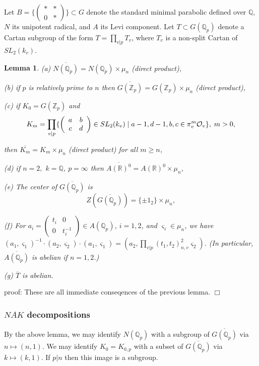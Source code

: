\documentclass[12pt]{article}
\newtheorem{lemma}[theorem]{Lemma}
\def\qqq{\mathbb{Q}}
\begin{document}
Let $B=\{\left( 
\begin{array}{cc}
\ast & * \\ 
0 & *
\end{array}
\right) \}\subset G$ denote the standard minimal parabolic
defined over $\qqq$, $N$ its unipotent radical, and
$A$ its Levi component. Let
$T\subset G(\qqq_p)$ denote a Cartan subgroup of the form
$T=\prod_{v|p}T_v$, where $T_v$ is a non-split
Cartan of $SL_2(k_v)$.

\begin{lemma}
(a) $\overline{N(\qqq_p)}=N(\qqq_p)\times \mu _n$ (direct product),

(b) if $p$ is relatively prime to $n$
then $\overline{G({\mathbb{Z}}_p)}=G({\mathbb{Z}}_p)\times \mu _n$ (direct product),

(c) if $K_0=G({\mathbb{Z}}_p)$ and 
\[
K_m=\prod_{v|p}\{\left( 
\begin{array}{cc}
a & b \\ 
c & d
\end{array}
\right) \in SL_2(k_v)\;|\;a-1,d-1,b,c\in \pi _v^m{\cal{O}}_v\},\;m>0,
\]

then $\overline{K_m}=K_m\times \mu _n$ (direct product) for all $m\geq n$,

(d) if $n=2,$ $k=\qqq$, $p=\infty $ then 
$\overline{A({\mathbb R})^0}=A({\mathbb R})^0 \times \mu _n$,

(e) The center of $\overline{G(\qqq_p)}$ is 
\[
Z(\overline{G(\qqq_p)})=
\{\pm 1_2\}\times \mu _n,
\]

(f) For $a_i=\left( 
\begin{array}{cc}
t_i & 0 \\ 
0 & t_i^{-1}
\end{array}
\right) \in A(\qqq_p)$, $i=1,2$, and $\varsigma _i\in \mu _n$, we have $%
(a_1,\varsigma _1)^{-1}\cdot (a_2,\varsigma _2)\cdot (a_1,\varsigma
_1)=(a_2,\prod_{v|p}(t_1,t_2)_{n,v}^2\varsigma _2)$.
(In particular, $\overline{A(\qqq_p)}$ is abelian if $n=1,2$.)

(g) $\overline{T}$ is abelian.
\end{lemma}

proof: These are all immediate conseqences of the previous lemma. $\Box $

\subsubsection{$NAK$ decompositions}

By the above lemma, we may identify $N(\qqq_p)$ with a subgroup of $%
\overline{G(\qqq_p)}$ via $n\longmapsto (n,1)$. We may identify $%
K_0=K_{0,p}$ with a subset of $\overline{G(\qqq_p)}$ via $k\longmapsto
(k,1)$. If $p|n$ then this image is a subgroup.
\end{document}
